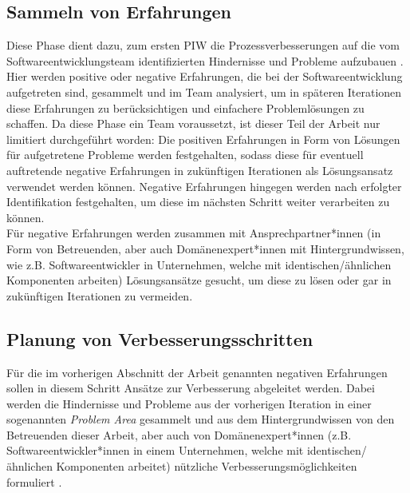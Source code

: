 \subsection{Sammeln von Erfahrungen}
Diese Phase dient dazu, zum ersten PIW die Prozessverbesserungen auf die vom Softwareentwicklungsteam identifizierten Hindernisse und Probleme aufzubauen \cite{salo2007iterative}. Hier werden positive oder negative Erfahrungen, die bei der Softwareentwicklung aufgetreten sind, gesammelt und im Team analysiert, um in späteren Iterationen diese Erfahrungen zu berücksichtigen und einfachere Problemlösungen zu schaffen. Da diese Phase ein Team voraussetzt, ist dieser Teil der Arbeit nur limitiert durchgeführt worden: Die positiven Erfahrungen in Form von Lösungen für aufgetretene Probleme werden festgehalten, sodass diese für eventuell auftretende negative Erfahrungen in zukünftigen Iterationen als Lösungsansatz verwendet werden können. Negative Erfahrungen hingegen werden nach erfolgter Identifikation festgehalten, um diese im nächsten Schritt weiter verarbeiten zu können. \\
Für negative Erfahrungen werden zusammen mit Ansprechpartner*innen (in Form von Betreuenden, aber auch Domänenexpert*innen mit Hintergrundwissen, wie z.B. Softwareentwickler in Unternehmen, welche mit identischen/ähnlichen Komponenten arbeiten) Lösungsansätze gesucht, um diese zu lösen oder gar in zukünftigen Iterationen zu vermeiden.

\subsection{Planung von Verbesserungsschritten}
Für die im vorherigen Abschnitt der Arbeit genannten negativen Erfahrungen sollen in diesem Schritt Ansätze zur Verbesserung abgeleitet werden. Dabei werden die Hindernisse und Probleme aus der vorherigen Iteration in einer sogenannten \textit{Problem Area} gesammelt und aus dem Hintergrundwissen von den Betreuenden dieser Arbeit, aber auch von Domänenexpert*innen (z.B. Softwareentwickler*innen in einem Unternehmen, welche mit identischen/ähnlichen Komponenten arbeitet) nützliche Verbesserungsmöglichkeiten formuliert \cite{salo2007iterative}. 

